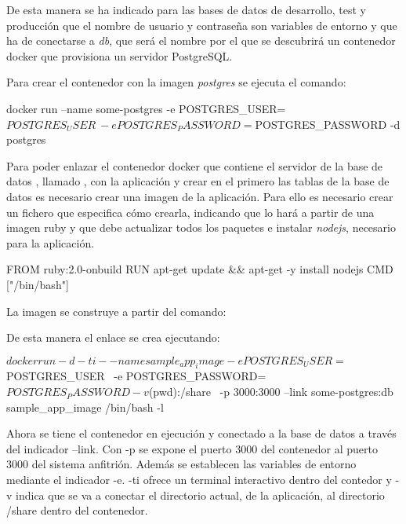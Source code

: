 De esta manera se ha indicado para las bases de datos de desarrollo, test y producción que el nombre de usuario y contraseña son variables de entorno y que ha de conectarse a \textit{db}, que será el nombre por el que se descubrirá un contenedor docker que provisiona un servidor PostgreSQL.

Para crear el contenedor con la imagen \textit{postgres} se ejecuta el comando:

\begin{code}
docker run --name some-postgres -e POSTGRES_USER=$POSTGRES_USER \
-e POSTGRES_PASSWORD=$POSTGRES_PASSWORD -d postgres
\end{code}

Para poder enlazar el contenedor docker que contiene el servidor de la base de datos , llamado , con la aplicación y crear en el primero las tablas de la base de datos es necesario crear una imagen de la aplicación. Para ello es necesario crear un fichero  que especifica cómo crearla, indicando que lo hará a partir de una imagen ruby y que debe actualizar todos los paquetes e instalar \textit{nodejs}, necesario para la aplicación.

\begin{codelisting}
\label{code:dockerfile}
\begin{code}
FROM ruby:2.0-onbuild
RUN apt-get update && apt-get -y install nodejs
CMD ["/bin/bash"]
\end{code}
\end{codelisting}

La imagen se construye a partir del comando:


De esta manera el enlace se crea ejecutando:

\begin{code}
$ docker run -d -ti --name sample_app_image -e POSTGRES_USER=$POSTGRES_USER \
 -e POSTGRES_PASSWORD=$POSTGRES_PASSWORD -v $(pwd):/share \
-p 3000:3000 --link some-postgres:db sample_app_image /bin/bash -l
\end{code}

Ahora se tiene el contenedor \kode{sample\_app\_image} en ejecución y conectado a la base de datos a través del indicador --link. Con -p se expone el puerto 3000 del contenedor al puerto 3000 del sistema anfitrión. Además se establecen las variables de entorno mediante el indicador -e. -ti ofrece un terminal interactivo dentro del contedor y -v indica que se va a conectar el directorio actual, de la aplicación, al directorio /share dentro del contenedor.

